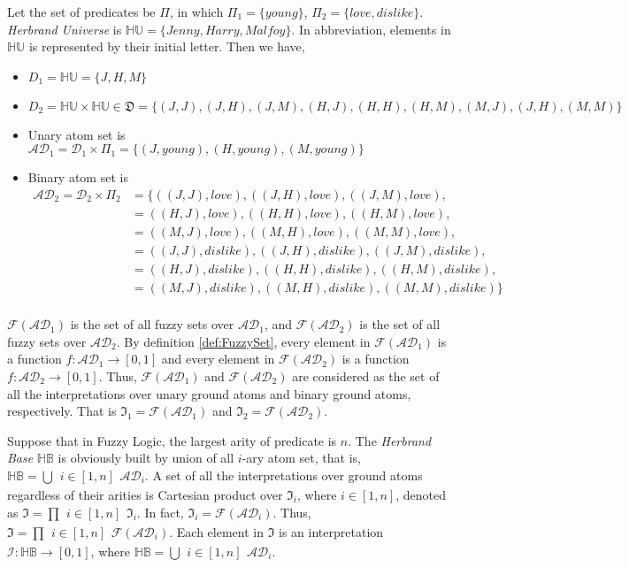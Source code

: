 \documentclass[Thesis.tex]{subfiles}
\begin{document}
\begin{ex}
\label{ex:AtomDomain}
Let the set of predicates be $\Pi$, in which $\Pi_1=\{young\}$, $\Pi_2=\{love, dislike\}$. \textit{Herbrand Universe} is $\mathbb{HU}=\{Jenny, Harry, Malfoy\}$. In abbreviation, elements in $\mathbb{HU}$ is represented by their initial letter. Then we have,
\begin{itemize}
\item $D_1 = \mathbb{HU} = \{J, H, M\}$
\item $D_2 = \mathbb{HU} \times \mathbb{HU} \in \mathfrak{D}=\{(J,J),(J,H),(J,M),(H,J),(H,H),(H,M),(M,J),(J,H),(M,M)\}$
\item Unary atom set is $\mathcal{AD}_1 = \mathcal{D}_1 \times \Pi_1 = \{(J,young),(H,young),(M,young)\}$
\item Binary atom set is 
\begin{align*}
\mathcal{AD}_2 = \mathcal{D}_2 \times \Pi_2 &=  \{((J,J),love),((J,H),love),((J,M),love),\\
									&= ((H,J),love),((H,H),love),((H,M),love),\\
									&= ((M,J),love),((M,H),love),((M,M),love),\\
  									&=((J,J),dislike),((J,H),dislike),((J,M),dislike),\\
									&=((H,J),dislike),((H,H),dislike),((H,M),dislike),\\
  									&=((M,J),dislike),((M,H),dislike),((M,M),dislike)\}\\
\end{align*}
\end{itemize}
$\mathcal{F}(\mathcal{AD}_1)$ is the set of all fuzzy sets over $\mathcal{AD}_1$, and $\mathcal{F}(\mathcal{AD}_2)$ is the set of all fuzzy sets over $\mathcal{AD}_2$. By definition \ref{def:FuzzySet}, every element in $\mathcal{F}(\mathcal{AD}_1)$ is a function $f: \mathcal{AD}_1 \rightarrow [0,1]$ and every element in $\mathcal{F}(\mathcal{AD}_2)$ is a function $f: \mathcal{AD}_2 \rightarrow [0,1]$. Thus, $\mathcal{F}(\mathcal{AD}_1)$ and $\mathcal{F}(\mathcal{AD}_2)$ are considered as the set of all the interpretations over unary ground atoms and binary ground atoms, respectively. That is $\mathfrak{I}_1=\mathcal{F}(\mathcal{AD}_1)$ and $\mathfrak{I}_2=\mathcal{F}(\mathcal{AD}_2)$.
\end{ex}

Suppose that in Fuzzy Logic, the largest arity of predicate is $n$. The \textit{Herbrand Base} $\mathbb{HB}$ is obviously built by union of all $i$-ary atom set, that is, $\mathbb{HB} = \bigcup{\substack{i \in [1,n]}}\mathcal{AD}_i$. A set of all the interpretations over ground atoms regardless of their arities is Cartesian product over $\mathfrak{I}_i$, where $i \in [1,n]$, denoted as $\mathfrak{I} = \prod{\substack{i \in [1,n]}}\mathfrak{I}_i$. In fact, $\mathfrak{I}_i=\mathcal{F}(\mathcal{AD}_i)$. Thus, $\mathfrak{I} = \prod{\substack{i \in [1,n]}}\mathcal{F}(\mathcal{AD}_i)$.  Each element in $\mathfrak{I}$ is an interpretation $\mathcal{I} : \mathbb{HB} \rightarrow [0,1]$, where $\mathbb{HB} = \bigcup{\substack{i \in [1,n]}}\mathcal{AD}_i$.
\end{document}
